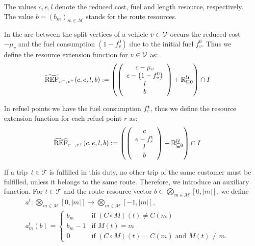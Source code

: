 The values $c, e, l$ denote the reduced cost, fuel and length resource, respectively. The value ${b=\left(b_m\right)_{m\in\mathcal{M}}}$ stands for the route resources. 

In the arc between the split vertices of a vehicle $v\in\mathcal{V}$ occurs the reduced cost $-\mu_v$ and the fuel consumption $\left(1-f^0_v\right)$ due to the initial fuel $f^0_v$. Thus we define the resource extension function for $v\in\mathcal{V}$ as:
\begin{align*}
	\widetilde{\operatorname{REF}}_{v^-,v^+}(c,e,l,b) := \left(\left(
	\begin{array}{c}
		c-\mu_v \\ e-\left(1-f^0_v\right) \\ l \\ b
	\end{array}
	\right) + \mathbb{R}^{\mathcal{U}}_{\sqsubseteq 0}\right) \cap I
\end{align*}

In refuel points we have the fuel consumption $f^{\operatorname{t}}_r$, thus we define the resource extension function for each refuel point $r$ as:
\begin{align*}
	\widetilde{\operatorname{REF}}_{r^-,r^+}(c,e,l,b) := \left(\left(
	\begin{array}{c}
		c \\ e-f^{\operatorname{t}}_r \\ l \\ b
	\end{array}
	\right) + \mathbb{R}^{\mathcal{U}}_{\sqsubseteq 0}\right) \cap I
\end{align*}

If a trip~$t\in\mathcal{T}$ is fulfilled in this duty, no other trip of the same customer must be fulfilled, unless it belongs to the same route. Therefore, we introduce an auxiliary function. For ${t\in\mathcal{T}}$ and  the route resource vector ${b\in\bigotimes_{m\in\mathcal{M}}\left[0,|m|\right]}$, we define
\begin{gather*}
	a^t:\bigotimes_{m\in\mathcal{M}}\left[0,|m|\right] \to \bigotimes_{m\in\mathcal{M}}\left[-1,|m|\right], \\
	a^t_m(b) = \left\{ \begin{array}{cl} b_m & \text{if } \left(C\circ M\right)(t)\neq C(m) \\ b_m - 1 & \text{if } M(t)=m \\ 0 & \text{if } \left(C\circ M\right)(t)=C(m) \text{ and } M(t)\neq m. \end{array} \right.
\end{gather*}

